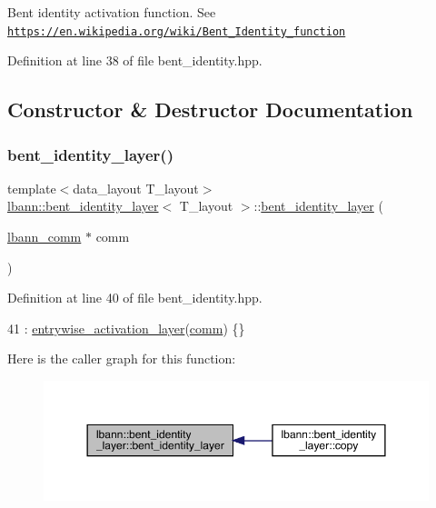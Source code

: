 Bent identity activation function. See \href{https://en.wikipedia.org/wiki/Bent_Identity_function}{\tt https\+://en.\+wikipedia.\+org/wiki/\+Bent\+\_\+\+Identity\+\_\+function} 

Definition at line 38 of file bent\+\_\+identity.\+hpp.



\subsection{Constructor \& Destructor Documentation}
\mbox{\label{classlbann_1_1bent__identity__layer_a74743e746947316d6fa043c39c5688b8}} 
\subsubsection{\texorpdfstring{bent\+\_\+identity\+\_\+layer()}{bent\_identity\_layer()}}
{\footnotesize\ttfamily template$<$data\+\_\+layout T\+\_\+layout$>$ \\
\hyperlink{classlbann_1_1bent__identity__layer}{lbann\+::bent\+\_\+identity\+\_\+layer}$<$ T\+\_\+layout $>$\+::\hyperlink{classlbann_1_1bent__identity__layer}{bent\+\_\+identity\+\_\+layer} (\begin{DoxyParamCaption}\item[{\hyperlink{classlbann_1_1lbann__comm}{lbann\+\_\+comm} $\ast$}]{comm }\end{DoxyParamCaption})\hspace{0.3cm}{\ttfamily [inline]}}



Definition at line 40 of file bent\+\_\+identity.\+hpp.


\begin{DoxyCode}
41     : \hyperlink{classlbann_1_1entrywise__activation__layer_aada1d9200612dcd13259799ef327c557}{entrywise\_activation\_layer}(\hyperlink{file__io_8cpp_ab048c6f9fcbcfaa57ce68b00263dbebe}{comm}) \{\}
\end{DoxyCode}
Here is the caller graph for this function\+:\nopagebreak
\begin{figure}[H]
\begin{center}
\leavevmode
\includegraphics[width=350pt]{classlbann_1_1bent__identity__layer_a74743e746947316d6fa043c39c5688b8_icgraph}
\end{center}
\end{figure}


